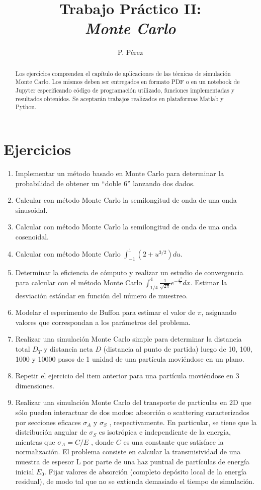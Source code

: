 \documentclass[a4paper,10pt]{article}
\title{{\bf Trabajo Práctico II:}\\ \emph{Monte Carlo}}
\author{P. Pérez}
\begin{document}
\maketitle

\begin{abstract}
Los ejercicios comprenden el capítulo de aplicaciones de las técnicas de simulación Monte Carlo. Los mismos deben ser entregados en formato PDF o en un notebook de Jupyter especificando código de programación utilizado, funciones implementadas y resultados obtenidos. Se aceptarán trabajos realizados en plataformas Matlab y Python.
\end{abstract}

\section*{Ejercicios}

\begin{enumerate}
 \item Implementar un método basado en Monte Carlo para determinar la probabilidad de obtener un ``doble 6'' lanzando dos dados.
 \item Calcular con método Monte Carlo la semilongitud de onda de una onda sinusoidal.
 \item Calcular con método Monte Carlo la semilongitud de onda de una onda cosenoidal.
 \item Calcular con método Monte Carlo $\int_{-1}^{1}(2 + u^{3/2}) du$.
 \item Determinar la eficiencia de cómputo y realizar un estudio de convergencia para calcular con el método Monte Carlo $\int_{1/4}^{4}\frac{1}{\sqrt{2\pi}}e^{-\frac{x^{2}}{2}}dx$. Estimar la desviación estándar en función del número de muestreo.
 \item Modelar el esperimento de Buffon para estimar el valor de $\pi$, asignando valores que correspondan a los parámetros del problema.
 \item Realizar una simulación Monte Carlo simple para determinar la distancia total $D_{T}$ y distancia neta $D$ (distancia al punto de partida) luego de 10, 100, 1000 y 10000 pasos de 1 unidad de una partícula moviéndose en un plano.
 \item Repetir el ejercicio del item anterior para una partícula moviéndose en 3 dimensiones.
 \item Realizar una simulación Monte Carlo del transporte de partículas en 2D que sólo pueden interactuar de dos modos: absorción o scattering caracterizados por secciones eficaces $\sigma_{A}$ y $\sigma_{S}$ , respectivamente. En particular, se tiene que la distribución angular de $\sigma_{S}$ es isotrópica e independiente de la energía, mientras que $\sigma_{A} = C/E$ , donde $C$ es una constante que satisface la normalización. El problema consiste en calcular la transmisividad de una muestra de espesor L por parte de una haz puntual de partículas de energía inicial $E_{0}$. Fijar valores de absorción (completo depósito local de la energía residual), de modo tal que no se extienda demasiado el tiempo de simulación.
 \end{enumerate}
\end{document}
